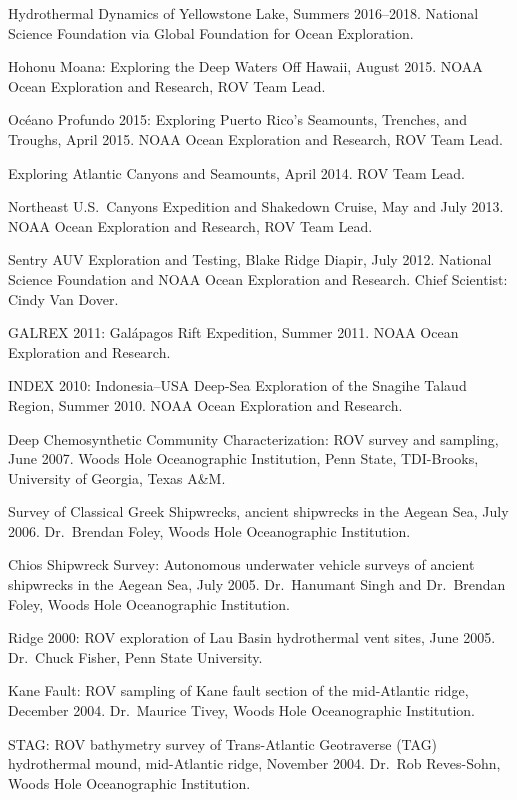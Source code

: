 \begin{cvenum}
  \item Hydrothermal Dynamics of Yellowstone Lake, Summers 2016--2018. National Science Foundation via Global Foundation for Ocean Exploration.
  \item Hohonu Moana: Exploring the Deep Waters Off Hawaii, August 2015. NOAA Ocean Exploration and Research, ROV Team Lead.
  \item Océano Profundo 2015: Exploring Puerto Rico's Seamounts, Trenches, and Troughs, April 2015. NOAA Ocean Exploration and Research, ROV Team Lead.
  \item Exploring Atlantic Canyons and Seamounts, April 2014. ROV Team Lead.
  \item Northeast U.S.\ Canyons Expedition and Shakedown Cruise, May and July 2013. NOAA Ocean Exploration and Research, ROV Team Lead.
  \item Sentry AUV Exploration and Testing, Blake Ridge Diapir, July 2012. National Science Foundation and NOAA Ocean Exploration and Research. Chief Scientist: Cindy Van Dover.
  \item GALREX 2011: Galápagos Rift Expedition, Summer 2011. NOAA Ocean Exploration and Research.
  \item INDEX 2010: Indonesia--USA Deep-Sea Exploration of the Snagihe Talaud Region, Summer 2010. NOAA Ocean Exploration and Research.
  \item Deep Chemosynthetic Community Characterization: ROV survey and sampling, June 2007. Woods Hole Oceanographic Institution, Penn State, TDI-Brooks, University of Georgia, Texas A\&M.
  \item Survey of Classical Greek Shipwrecks, ancient shipwrecks in the Aegean Sea, July 2006. Dr.\ Brendan Foley, Woods Hole Oceanographic Institution.
  \item Chios Shipwreck Survey: Autonomous underwater vehicle surveys of ancient shipwrecks in the Aegean Sea, July 2005. Dr.\ Hanumant Singh and Dr.\ Brendan Foley, Woods Hole Oceanographic Institution.
  \item Ridge 2000: ROV exploration of Lau Basin hydrothermal vent sites, June 2005. Dr.\ Chuck Fisher, Penn State University.
  \item Kane Fault: ROV sampling of Kane fault section of the mid-Atlantic ridge, December 2004. Dr.\ Maurice Tivey, Woods Hole Oceanographic Institution.
  \item STAG: ROV bathymetry survey of Trans-Atlantic Geotraverse (TAG) hydrothermal mound, mid-Atlantic ridge, November 2004. Dr.\ Rob Reves-Sohn, Woods Hole Oceanographic Institution.

\end{cvenum}
